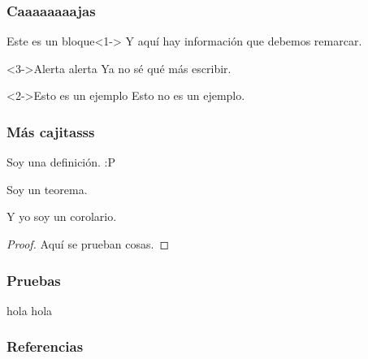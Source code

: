 \documentclass{beamer}
\begin{document}
\begin{frame}
    \frametitle{Caaaaaaaajas}

    \begin{block}{Este es un bloque}<1->
        Y aquí hay información que debemos remarcar.
    \end{block}

    \begin{alertblock}<3->{Alerta alerta}
        Ya no sé qué más escribir.
    \end{alertblock}

    \begin{exampleblock}<2->{Esto es un ejemplo}
        Esto no es un ejemplo.
    \end{exampleblock}

\end{frame}

\begin{frame}
    \frametitle{Más cajitasss}

    \begin{definition}
        Soy una definición. :P
    \end{definition} \pause

    \begin{theorem}
        Soy un teorema.
    \end{theorem} \pause

    \begin{corollary}
        Y yo soy un corolario.
    \end{corollary} \pause

    \begin{proof}
        Aquí se prueban cosas.
    \end{proof}

\end{frame}

\begin{frame}[t]
    \frametitle{Pruebas}

    \begin{exampleblock}{hola}
        hola
    \end{exampleblock}

\end{frame}

\begin{frame}
    \frametitle{Referencias}

    \printbibliography

\end{frame}
\end{document}

